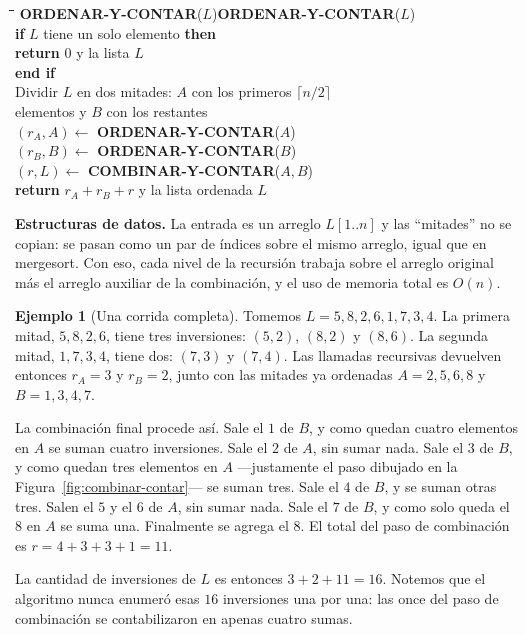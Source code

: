 \documentclass[12pt, spanish, oneside, openany]{book}
\newcommand{\pl}[1]{\makebox[1.6em][r]{\texttt{\footnotesize #1}}\hspace{0.9em}}
\newenvironment{pseudo}[1]{%
  \begin{center}%
  \begin{mdframed}[style=pseudobox]%
  \small
  \begin{tabbing}%
  \hspace{2.5em}\=\hspace{1.5em}\=\hspace{1.5em}\=\hspace{1.5em}\=\hspace{1.5em}\=\kill
  \def\pseudotitulo{#1}\ifx\pseudotitulo\empty\else#1\\[3pt]\fi}%
  {\end{tabbing}\end{mdframed}\end{center}}
\newenvironment{estructuras}%
  {\begin{center}\begin{minipage}{0.93\textwidth}\begin{mdframed}[style=estrbox]%
   \small\textbf{Estructuras de datos.}\;}%
  {\end{mdframed}\end{minipage}\end{center}}
\theoremstyle{uprightplain}
\theoremstyle{definition}
\newtheorem{ejemplo}[teorema]{Ejemplo}
\theoremstyle{remark}
\theoremstyle{definition}
\begin{document}
\begin{pseudo}{\textbf{ORDENAR-Y-CONTAR}($L$)}
\pl{1}\> \textbf{if} $L$ tiene un solo elemento \textbf{then}\\
\pl{2}\>\> \textbf{return} $0$ y la lista $L$\\
\pl{3}\> \textbf{end if}\\
\pl{4}\> Dividir $L$ en dos mitades: $A$ con los primeros $\lceil n/2\rceil$\\
\pl{ }\> elementos y $B$ con los restantes\\
\pl{5}\> $(r_A, A) \leftarrow$ \textbf{ORDENAR-Y-CONTAR}($A$)\\
\pl{6}\> $(r_B, B) \leftarrow$ \textbf{ORDENAR-Y-CONTAR}($B$)\\
\pl{7}\> $(r, L) \leftarrow$ \textbf{COMBINAR-Y-CONTAR}($A,B$)\\
\pl{8}\> \textbf{return} $r_A + r_B + r$ y la lista ordenada $L$
\end{pseudo}

\begin{estructuras}
La entrada es un arreglo $L[1..n]$ y las ``mitades'' no se copian: se pasan como
un par de índices sobre el mismo arreglo, igual que en mergesort. Con eso, cada
nivel de la recursión trabaja sobre el arreglo original más el arreglo auxiliar
de la combinación, y el uso de memoria total es $O(n)$.
\end{estructuras}

\begin{ejemplo}[Una corrida completa]
\label{ej:corrida-inversiones}
Tomemos $L = 5,8,2,6,1,7,3,4$. La primera mitad, $5,8,2,6$, tiene tres inversiones: $(5,2)$, $(8,2)$ y $(8,6)$. La segunda mitad, $1,7,3,4$, tiene dos: $(7,3)$ y $(7,4)$. Las llamadas recursivas devuelven entonces $r_A=3$ y $r_B=2$, junto con las mitades ya ordenadas $A=2,5,6,8$ y $B=1,3,4,7$.

La combinación final procede así. Sale el $1$ de $B$, y como quedan cuatro elementos en $A$ se suman cuatro inversiones. Sale el $2$ de $A$, sin sumar nada. Sale el $3$ de $B$, y como quedan tres elementos en $A$ ---justamente el paso dibujado en la Figura~\ref{fig:combinar-contar}--- se suman tres. Sale el $4$ de $B$, y se suman otras tres. Salen el $5$ y el $6$ de $A$, sin sumar nada. Sale el $7$ de $B$, y como solo queda el $8$ en $A$ se suma una. Finalmente se agrega el $8$. El total del paso de combinación es $r = 4+3+3+1 = 11$.

La cantidad de inversiones de $L$ es entonces $3+2+11=16$. Notemos que el algoritmo nunca enumeró esas $16$ inversiones una por una: las once del paso de combinación se contabilizaron en apenas cuatro sumas.
\end{ejemplo}
\end{document}
